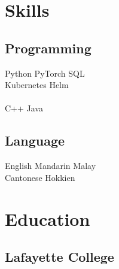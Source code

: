 \documentclass{deedy-resume-openfont}
\begin{document}
\begin{minipage}[t]{0.33\textwidth}


\section{Skills}
\subsection{Programming}
Python \textbullet{} PyTorch \textbullet{} SQL \\
Kubernetes \textbullet{} Helm \\
 \\
C++ \textbullet{} Java \\
\sectionsep

\subsection{Language}
English \textbullet{} Mandarin \textbullet{} Malay \\
Cantonese \textbullet{} Hokkien
\sectionsep


\section{Education}

\subsection{Lafayette College}
\sectionsep

%
%

\end{minipage}
\hfill
\end{document}
